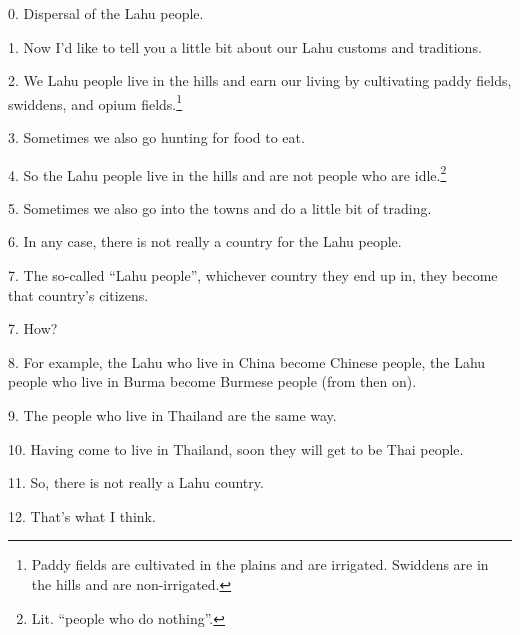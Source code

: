 \setcounter{footnote}{0}

0. Dispersal of the Lahu people.

1. Now I'd like to tell you a little bit about our Lahu customs and traditions.

2. We Lahu people live in the hills and earn our living by cultivating paddy fields,
swiddens, and opium fields.\footnote{Paddy fields are cultivated in the plains and are irrigated. Swiddens are in the hills and are non-irrigated.}

3. Sometimes we also go hunting for food to eat.

4. So the Lahu people live in the hills and are not people who are idle.\footnote{Lit. ``people who do nothing''.}

5. Sometimes we also go into the towns and do a little bit of trading.

6. In any case, there is not really a country for the Lahu people.

7. The so-called ``Lahu people'', whichever country they end up
in, they become that country's citizens.

7. How?

8. For example, the Lahu who live in China become Chinese people, the Lahu people
who live in Burma become Burmese people (from then on).

9. The people who live in Thailand are the same way.

10. Having come to live in Thailand, soon they will get to be Thai people.

11. So, there is not really a Lahu country.

12. That's what I think.

